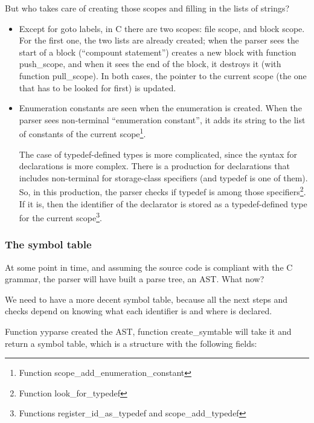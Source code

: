 \documentclass[a4paper,openany]{article}
\begin{document}
But who takes care of creating those scopes and filling in the lists of strings?

\begin{itemize}
\item Except for goto labels, in C there are two scopes: file scope, and block scope. For the first one, the two lists are already created; when the parser sees the start of a block (``compount statement'') creates a new block with function push\_scope, and when it sees the end of the block, it destroys it (with function pull\_scope). In both cases, the pointer to the current scope (the one that has to be looked for first) is updated.

\item Enumeration constants are seen when the enumeration is created. When the parser sees non-terminal ``enumeration constant'', it adds its string to the list of constants of the current scope\footnote{Function scope\_add\_enumeration\_constant}.

The case of typedef-defined types is more complicated, since the syntax for declarations is more complex. There is a production for declarations that includes non-terminal for storage-class specifiers (and typedef is one of them). So, in this production, the parser checks if typedef is among those specifiers\footnote{Function look\_for\_typedef}. If it is, then the identifier of the declarator is stored as a typedef-defined type for the current scope\footnote{Functions register\_id\_as\_typedef and scope\_add\_typedef}.
\end{itemize}

\subsubsection{The symbol table}
At some point in time, and assuming the source code is compliant with the C grammar, the parser will have built a parse tree, an AST. What now?

We need to have a more decent symbol table, because all the next steps and checks depend on knowing what each identifier is and where is declared.

Function yyparse created the AST, function create\_symtable will take it and return a symbol table, which is a structure with the following fields:
\end{document}
